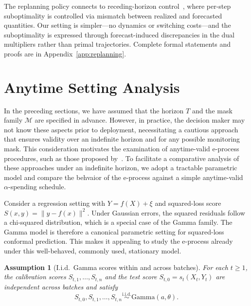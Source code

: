 \documentclass{uai2026} %
\newtheorem{assumption}[theorem]{Assumption}
\newcommand{\R}{\mathbb{R}}
\newcommand{\rset}{\R}
\newcommand{\1}{\mathbf{1}}
\newcommand{\ycal}{\mathcal{Y}}
\newcommand{\mcal}{\mathcal{M}}
\begin{document}
The replanning policy connects to receding-horizon control~\citep{lin2021perturbation,lin2022bounded,li2020leveraging,vera2021online}, where per-step suboptimality is controlled via mismatch between realized and forecasted quantities.
Our setting is simpler---no dynamics or switching costs---and the suboptimality is expressed through forecast-induced discrepancies in the dual multipliers rather than primal trajectories.
Complete formal statements and proofs are in Appendix~\ref{app:replanning}.

\section{Anytime Setting Analysis}
\label{sec:ville}

In the preceding sections, we have assumed that the horizon $T$ and the mask family $\mcal$ are specified in advance. However, in practice, the decision maker may not know these aspects prior to deployment, necessitating a cautious approach that ensures validity over an indefinite horizon and for any possible monitoring mask. This consideration motivates the examination of anytime-valid e-process procedures, such as those proposed by~\citet{gauthier2025values}. To facilitate a comparative analysis of these approaches under an indefinite horizon, we adopt a tractable parametric model and compare the behvaior of the e-process against a simple anytime-valid $\alpha$-spending schedule.

Consider a regression setting with $Y = f(X) + \xi$ and squared-loss score $S(x,y) = \|y-f(x)\|^2$.
Under Gaussian errors, the squared residuals follow a chi-squared distribution, which is a special case of the Gamma family.
The Gamma model is therefore a canonical parametric setting for squared-loss conformal prediction. This makes it appealing to study the e-process already under this well-behaved, commonly used,  stationary model.


\begin{assumption}[I.i.d.\ Gamma scores within and across batches]
  \label{ass:gamma-scores}
  For each $t\ge 1$, the calibration scores $S_{t,1}, \dots, S_{t,n}$ and the test score $S_{t,0} = s_t(X_t, Y_t)$ are independent across batches and  satisfy
  \begin{equation*}
    S_{t,0}, S_{t,1}, \ldots, S_{t,n} \stackrel{\text{i.i.d.}}{\sim} \mathrm{Gamma}(a, \theta).
  \end{equation*}
\end{assumption}
\end{document}
